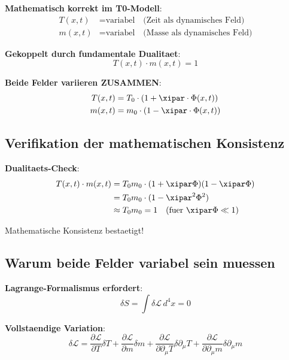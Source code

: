 	\textbf{Mathematisch korrekt im T0-Modell}:
	\begin{align}
		T(x,t) &= \text{variabel} \quad \text{(Zeit als dynamisches Feld)} \\
		m(x,t) &= \text{variabel} \quad \text{(Masse als dynamisches Feld)}
	\end{align}
	
	\textbf{Gekoppelt durch fundamentale Dualitaet}:
	\begin{equation}
		T(x,t) \cdot m(x,t) = 1
	\end{equation}
	
	\textbf{Beide Felder variieren ZUSAMMEN}:
	\begin{align}
		T(x,t) &= T_0 \cdot (1 + \xipar \cdot \Phi(x,t)) \\
		m(x,t) &= m_0 \cdot (1 - \xipar \cdot \Phi(x,t))
	\end{align}
	
	\subsection{Verifikation der mathematischen Konsistenz}
	
	\textbf{Dualitaets-Check}:
	\begin{align}
		T(x,t) \cdot m(x,t) &= T_0 m_0 \cdot (1 + \xipar \Phi)(1 - \xipar \Phi) \\
		&= T_0 m_0 \cdot (1 - \xipar^2 \Phi^2) \\
		&\approx T_0 m_0 = 1 \quad \text{(fuer } \xipar \Phi \ll 1\text{)}
	\end{align}
	
	Mathematische Konsistenz bestaetigt!
	
	\subsection{Warum beide Felder variabel sein muessen}
	
	\textbf{Lagrange-Formalismus erfordert}:
	\begin{equation}
		\delta S = \int \delta \mathcal{L} \, d^4x = 0
	\end{equation}
	
	\textbf{Vollstaendige Variation}:
	\begin{equation}
		\delta \mathcal{L} = \frac{\partial \mathcal{L}}{\partial T}\delta T + \frac{\partial \mathcal{L}}{\partial m}\delta m + \frac{\partial \mathcal{L}}{\partial \partial_\mu T}\delta \partial_\mu T + \frac{\partial \mathcal{L}}{\partial \partial_\mu m}\delta \partial_\mu m
	\end{equation}
	
